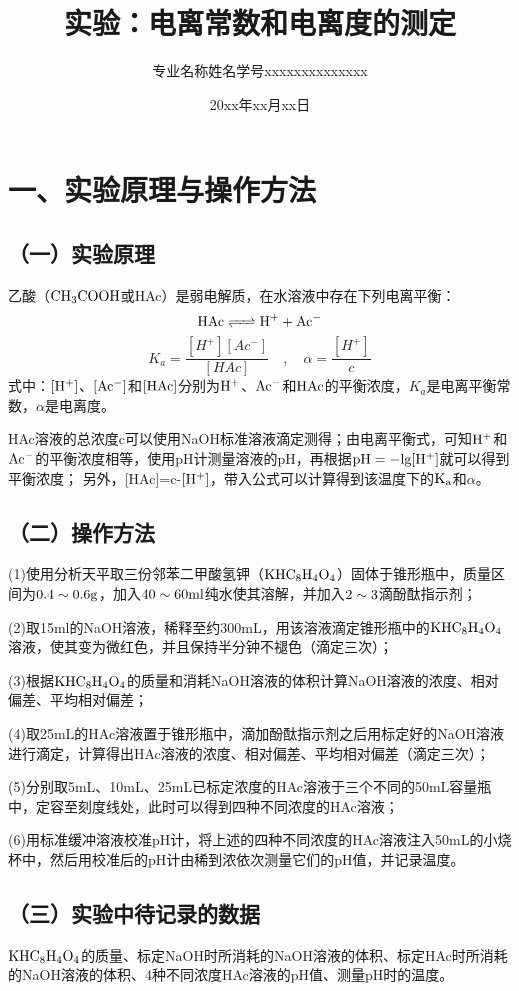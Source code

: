 \documentclass[a4paper,12pt]{article}
\title{\heiti\zihao{2} 实验：电离常数和电离度的测定}
\author{专业名称\quad 姓\;名\quad 学号xxxxxxxxxxxxxx}
\date{20xx年xx月xx日}
\begin{document}
\maketitle

\setcounter{section}{0}
\section*{一、实验原理与操作方法}
\subsection*{（一）实验原理}
乙酸（$\rm CH_3COOH$或HAc）是弱电解质，在水溶液中存在下列电离平衡：
$$
\ce{HAc <=> H^+ + Ac^-}
$$
$$
K_a=\frac{[H^+][Ac^-]}{[HAc]}\quad,\quad \alpha = \frac{[H^+]}{c}
$$
式中：$\rm [H^+]$、$\rm [Ac^-]$和$\rm [HAc]$分别为$\rm H^+$、$\rm Ac^-$和$\rm HAc$的平衡浓度，$K_a$是电离平衡常数，$\alpha$是电离度。

HAc溶液的总浓度c可以使用NaOH标准溶液滴定测得；由电离平衡式，可知$\rm H^+$和$\rm Ac^-$的平衡浓度相等，使用pH计测量溶液的pH，再根据$\rm pH=-lg[H^+]$就可以得到平衡浓度；
另外，[HAc]=c-$\rm [H^+]$，带入公式可以计算得到该温度下的$\rm K_a$和$\alpha$。

\subsection*{（二）操作方法}
(1)使用分析天平取三份邻苯二甲酸氢钾（$\rm KHC_8H_4O_4$）固体于锥形瓶中，质量区间为$\rm 0.4\sim0.6g$，加入$\rm 40\sim60ml$纯水使其溶解，并加入$\rm 2\sim3$滴酚酞指示剂；

(2)取15ml的NaOH溶液，稀释至约300mL，用该溶液滴定锥形瓶中的$\rm KHC_8H_4O_4$溶液，使其变为微红色，并且保持半分钟不褪色（滴定三次）；

(3)根据$\rm KHC_8H_4O_4$的质量和消耗NaOH溶液的体积计算NaOH溶液的浓度、相对偏差、平均相对偏差；

(4)取25mL的HAc溶液置于锥形瓶中，滴加酚酞指示剂之后用标定好的NaOH溶液进行滴定，计算得出HAc溶液的浓度、相对偏差、平均相对偏差（滴定三次）；

(5)分别取5mL、10mL、25mL已标定浓度的HAc溶液于三个不同的50mL容量瓶中，定容至刻度线处，此时可以得到四种不同浓度的HAc溶液；

(6)用标准缓冲溶液校准pH计，将上述的四种不同浓度的HAc溶液注入50mL的小烧杯中，然后用校准后的pH计由稀到浓依次测量它们的pH值，并记录温度。

\subsection*{（三）实验中待记录的数据}
$\rm KHC_8H_4O_4$的质量、标定NaOH时所消耗的NaOH溶液的体积、标定HAc时所消耗的NaOH溶液的体积、4种不同浓度HAc溶液的pH值、测量pH时的温度。
\end{document}
